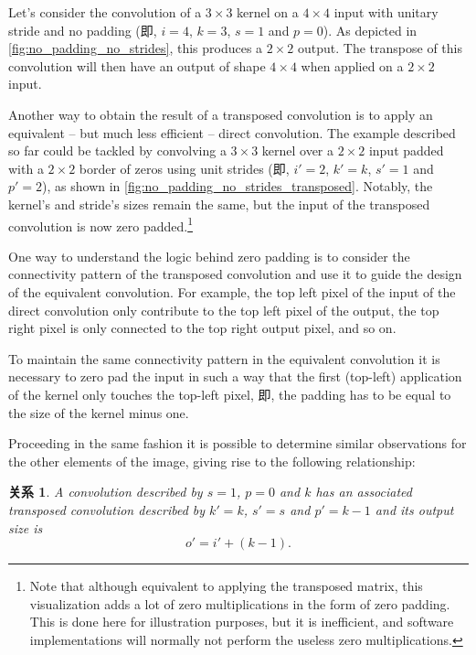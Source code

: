 \documentclass[notitlepage]{ctexrep}
\newtheorem{relationship}{关系}
\begin{document}
Let's consider the convolution of a $3 \times 3$ kernel on a $4 \times 4$
input with unitary stride and no padding (即, $i = 4$, $k = 3$, $s = 1$ and
$p = 0$). As depicted in \autoref{fig:no_padding_no_strides}, this produces a
$2 \times 2$ output. The transpose of this convolution will then have an output
of shape $4 \times 4$ when applied on a $2 \times 2$ input.

Another way to obtain the result of a transposed convolution is to apply an
equivalent -- but much less efficient -- direct convolution. The example
described so far could be tackled by convolving a $3 \times 3$ kernel over a
$2 \times 2$ input padded with a $2 \times 2$ border of zeros using unit
strides (即, $i' = 2$, $k' = k$, $s' = 1$ and $p' = 2$), as shown in
\autoref{fig:no_padding_no_strides_transposed}. Notably, the kernel's and
stride's sizes remain the same, but the input of the transposed convolution is
now zero padded.\footnote{Note that although
    equivalent to applying the transposed matrix, this visualization adds a lot
    of zero multiplications in the form of zero padding.  This is done here for
    illustration purposes, but it is inefficient, and software implementations
    will normally not perform the useless zero multiplications.}

One way to understand the logic behind zero padding is to consider the
connectivity pattern of the transposed convolution and use it to guide the
design of the equivalent convolution. For example, the top left pixel of the
input of the direct convolution only contribute to the top left pixel of the
output, the top right pixel is only connected to the top right output pixel,
and so on.

To maintain the same connectivity pattern in the equivalent convolution it is
necessary to zero pad the input in such a way that the first (top-left)
application of the kernel only touches the top-left pixel, 即, the padding
has to be equal to the size of the kernel minus one.

Proceeding in the same fashion it is possible to determine similar observations
for the other elements of the image, giving rise to the following relationship:

\begin{relationship}\label{rel:no_padding_no_strides_transposed}
A convolution described by $s = 1$, $p = 0$ and $k$ has an associated
transposed convolution described by $k' = k$, $s' = s$ and $p' = k - 1$ and its
output size is
\begin{equation*}
    o' = i' + (k - 1).
\end{equation*}
\end{relationship}
\end{document}

